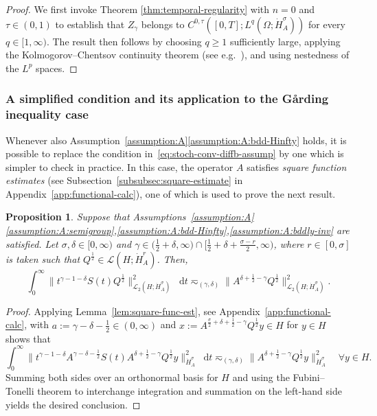 \documentclass[reqno]{amsart}
\numberwithin{equation}{section}
\newcommand{\rd}{\mathop{}\!\mathrm{d}}
\newcommand{\Hdot}[1]{\dot{H}^{#1}_A}
\newtheorem{proposition}[lemma]{Proposition}
\theoremstyle{remark}
\theoremstyle{definition}
\begin{document}
\begin{proof}
	We first invoke Theorem \ref{thm:temporal-regularity} 
	with $n = 0$ and 
	$\tau\in(0,1)$ 
	to establish that $Z_\gamma$ belongs to 
	$C^{0,\tau}([0,T]; L^q(\Omega;\dot H_A^\sigma))$ 
	for every $q \in[1,\infty)$. 
	The result then follows by choosing $q \geq 1$ 
	sufficiently large, applying the 
	Kolmogorov--Chentsov continuity theorem 
	(see e.g.\ \cite[Theorem~3.9]{Cox2021local}), 
	and using nestedness of the $L^p$ spaces. 
\end{proof}

\subsubsection{A simplified condition and its application to the G{\aa}rding inequality case} 
\label{subsubsec:simplified} 

Whenever also  
Assumption~\ref{assumption:A}\ref{assumption:A:bdd-Hinfty} holds,  
it is possible to replace 
the condition in~\eqref{eq:stoch-conv-diffb-assump} 
by one which is simpler to check in practice.
In this case, the operator $A$ satisfies 
\emph{square function estimates} 
(see Subsection~\ref{subsubsec:square-estimate} 
in Appendix~\ref{app:functional-calc}), 
one of which is used to prove the next result.
%
\begin{proposition}\label{prop:easier-condition-H-infty}
	Suppose that 
	Assumptions~\textup{\ref{assumption:A}\ref{assumption:A:semigroup},\ref{assumption:A:bdd-Hinfty},\ref{assumption:A:bddly-inv}} 
	are satisfied.
	Let  
	$\sigma, \delta \in [0, \infty)$
	and $\gamma \in \bigl(\frac{1}{2}+\delta,\infty\bigr) 
	\cap 
	\bigl[\frac{1}{2}+\delta+\frac{\sigma-r}{2},\infty\bigr)$, 
	where $r \in [0,\sigma]$ 
	is taken such that $Q^{\frac{1}{2}} \in \mathscr L(H; \dot H_A^r)$. 
	Then, 
	\[
	\int_0^\infty 
	\bigl\| t^{\gamma-1-\delta} S(t) Q^{\frac{1}{2}} \bigr\|_{
		\mathscr L_2(H; \Hdot{\sigma})}^2 \rd t 
	\eqsim_{(\gamma,\delta)} 
	\bigl\| A^{ \delta + \frac{1}{2} - \gamma } Q^{\frac{1}{2}} 
	\bigr\|_{\mathscr L_2(H;\Hdot \sigma)}^2.
	\] 
\end{proposition}

\begin{proof}
	Applying Lemma~\ref{lem:square-func-est}, 
	see Appendix~\ref{app:functional-calc}, 
	with $a := \gamma - \delta - \frac{1}{2} \in (0,\infty)$ and
	$x := A^{ \frac{\sigma}{2}+\delta+\frac{1}{2}-\gamma }Q^\frac{1}{2} y \in H$ 
	for $y\in H$ shows that  
	\[ 
	\int_0^\infty 
	\bigl\| t^{\gamma-1-\delta} A^{ \gamma-\delta-\frac{1}{2} } 
	S(t) A^{ \delta+\frac{1}{2}-\gamma } Q^\frac{1}{2} y \bigr\|_{\Hdot\sigma}^2 \rd t 
	\eqsim_{(\gamma,\delta)}
	\bigl\| A^{ \delta+\frac{1}{2}-\gamma } Q^\frac{1}{2} y \bigr\|_{\Hdot\sigma}^2  
	\quad 
	\forall y \in H.
	\]
	Summing both sides over an orthonormal basis for $H$ 
	and using the Fubini--Tonelli theorem to interchange integration 
	and summation on the left-hand side yields
	the desired conclusion.
\end{proof}
\end{document}

